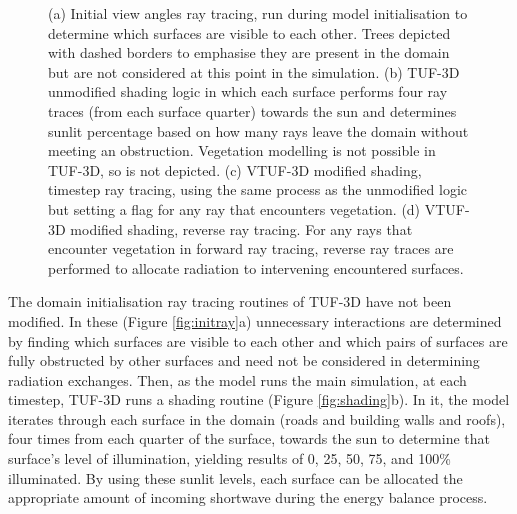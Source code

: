 \documentclass[final,3p,times,authoryear]{elsarticle}
\begin{document}
\begin{figure}[!htbp]
{   }
  \hspace{0.5cm}
   \caption{(a) Initial view angles ray tracing, run during model initialisation to determine which surfaces are visible to each other. Trees depicted with dashed borders to emphasise they are present in the domain but are not considered at this point in the simulation. \label{fig:initray} (b) TUF-3D unmodified shading logic in which each surface performs four ray traces (from each surface quarter) towards the sun and determines sunlit percentage based on how many rays leave the domain without meeting an obstruction. Vegetation modelling is not possible in TUF-3D, so is not depicted. \label{fig:shading} (c) VTUF-3D modified shading, timestep ray tracing, using the same process as the unmodified logic but setting a flag for any ray that encounters vegetation. \label{fig:modshading} (d) VTUF-3D modified shading, reverse ray tracing. For any rays that encounter vegetation in forward ray tracing, reverse ray traces are performed to allocate radiation to intervening encountered surfaces. \label{fig:modshadingreverse}} 
\end{figure}


The domain initialisation ray tracing routines of TUF-3D have not been modified. In these (Figure \ref{fig:initray}a) unnecessary interactions are determined by finding which surfaces are visible to each other and which pairs of surfaces are fully obstructed by other surfaces and need not be considered in determining radiation exchanges. Then, as the model runs the main simulation, at each timestep, TUF-3D runs a shading routine (Figure \ref{fig:shading}b). In it, the model iterates through each surface in the domain (roads and building walls and roofs), four times from each quarter of the surface, towards the sun to determine that surface's level of illumination, yielding results of 0, 25, 50, 75, and 100\% illuminated. By using these sunlit levels, each surface can be allocated the appropriate amount of incoming shortwave during the energy balance process.
\end{document}
